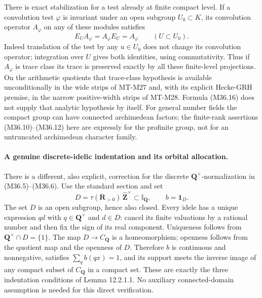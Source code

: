There is exact stabilization for a test already at
finite compact level.  If a convolution test $\varphi$
is invariant under an open subgroup $U_0\subset K$,
its convolution operator $A_\varphi$ on any of these
modules satisfies
\[
        E_U A_\varphi=A_\varphi E_U=A_\varphi
                          \qquad(U\subset U_0).
 \tag{M36.16}
\]
Indeed translation of the test by any $u\in U_0$
does not change its convolution operator; integration
over $U$ gives both identities, using commutativity.
Thus if $A_\varphi$ is trace class its trace is preserved
exactly by all these finite-level projections.  On the
arithmetic quotients that trace-class hypothesis is
available unconditionally in the wide strips of MT-M27
and, with its explicit Hecke-GRH premise, in the narrow
positive-width strips of MT-M28.  Formula (M36.16) does
not supply that analytic hypothesis by itself.
For general number fields the compact group can have
connected archimedean factors; the finite-rank assertions
(M36.10)--(M36.12) here are expressly for the profinite
group, not for an untruncated archimedean character family.

\paragraph{A genuine discrete-idelic indentation and its orbital allocation.}
There is a different, also explicit, correction for
the discrete $\mathbf Q^\times$-normalization in
(M36.5)--(M36.6).  Use the standard section and set
\[
 D=\tau(\mathbf R_{>0})\,\widehat{\mathbf Z}^\times
       \subset\mathbb I_{\mathbf Q},\qquad b=\mathbf1_D.
 \tag{M36.17}
\]
The set $D$ is an open subgroup, hence also closed.
Every idele has a unique expression $q d$ with
$q\in\mathbf Q^\times$ and $d\in D$: cancel its
finite valuations by a rational number and then fix
the sign of its real component.  Uniqueness follows
from $\mathbf Q^\times\cap D=\{1\}$.
The map $D\to C_{\mathbf Q}$ is a homeomorphism;
openness follows from the quotient map and the
openness of $D$.  Therefore $b$ is continuous and
nonnegative, satisfies $\sum_qb(qx)=1$, and its support
meets the inverse image of any compact subset of
$C_{\mathbf Q}$ in a compact set.  These are exactly
the three indentation conditions of Lemma 12.2.1.1.
No auxiliary connected-domain assumption is needed
for this direct verification.

